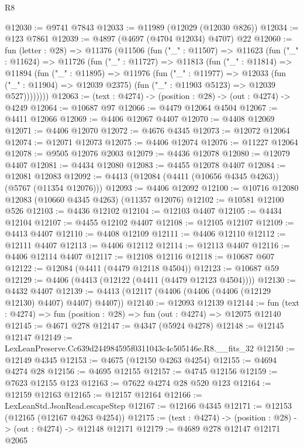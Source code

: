 \begin{lexlean}{R8}
\begin{coremodule}
@12030 := @9741 @7843
@12033 := @11989 (@12029 (@12030 @826))
@12034 := @123 @7861
@12039 := @4897 (@4697 (@4704 @12034) @4707) @22
@12060 := fun (letter : @28) =>
  @11376
    (@11506
      (fun ("_" : @11507) =>
      @11623
        (fun ("_" : @11624) =>
        @11726
          (fun ("_" : @11727) =>
          @11813
            (fun ("_" : @11814) =>
            @11894
              (fun ("_" : @11895) =>
              @11976
                (fun ("_" : @11977) =>
                @12033
                  (fun ("_" : @11904) => @12039 @2375)
                  (fun ("_" : @11903 @5123) => @12039 @527))))))))
@12063 := (text : @4274) -> (position : @28) -> (out : @4274) -> @4249
@12064 := @10687 @97
@12066 := @4479 @12064 @4504
@12067 := @4411 @12066
@12069 := @4406 @12067 @4407
@12070 := @4408 @12069
@12071 := @4406 @12070
@12072 := @4676 @4345
@12073 := @12072 @12064
@12074 := @12071 @12073
@12075 := @4406 @12074
@12076 := @11227 @12064
@12078 := @9505 @12076 @2003
@12079 := @4436 @12078
@12080 := @12079 @4407
@12081 := @4434 @12080
@12083 := @4455 @12078 @4407
@12084 := @12081 @12083
@12092 := @4413 (@12084 (@4411 (@10656 @4345 @4263)) (@5767 (@11354 @12076)))
@12093 := @4406 @12092
@12100 := @10716 @12080 @12083 (@10660 @4345 @4263) (@11357 @12076)
@12102 := @10581 @12100 @526
@12103 := @4436 @12102
@12104 := @12103 @4407
@12105 := @4434 @12104
@12107 := @4455 @12102 @4407
@12108 := @12105 @12107
@12109 := @4413 @4407
@12110 := @4408 @12109
@12111 := @4406 @12110
@12112 := @12111 @4407
@12113 := @4406 @12112
@12114 := @12113 @4407
@12116 := @4406 @12114 @4407
@12117 := @12108 @12116
@12118 := @10687 @607
@12122 := @12084 (@4411 (@4479 @12118 @4504))
@12123 := @10687 @59
@12129 := @4406 (@4413 (@12122 (@4411 (@4479 @12123 @4504))))
@12130 := @4432 @4407
@12139 := @4413 (@12117 (@4406 (@4406 (@4406 (@12129 @12130) @4407) @4407) @4407))
@12140 := @12093 @12139
@12144 := fun (text : @4274) => fun (position : @28) => fun (out : @4274) => @12075 @12140
@12145 := @4671 @278
@12147 := @4347 (@5924 @4278)
@12148 := @12145 @12147
@12149 := LexLeanPreserve.Cc639d244984595f0311043c4c505146e.R8.__fits_32
@12150 := @12149 @4345
@12153 := @4675 (@12150 @4263 @4254)
@12155 := @4694 @4274 @28
@12156 := @4695 @12155
@12157 := @4745 @12156
@12159 := @7623 @12155 @123
@12163 := @7622 @4274 @28 @520 @123
@12164 := @12159 @12163
@12165 := @12157 @12164
@12166 := LexLeanStd.JsonRead.escapeStep
@12167 := @12166 @4345
@12171 := @12153 (@12165 (@12167 @4263 @4254))
@12175 := (text : @4274) -> (position : @28) -> (out : @4274) -> @12148 @12171
@12179 := @4689 @278 @12147 @12171 @2065

\end{coremodule}
\end{lexlean}
